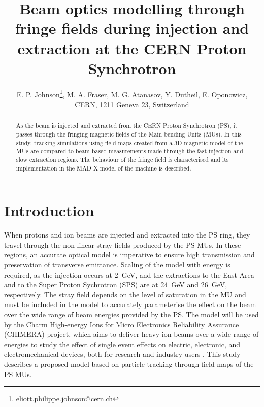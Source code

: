 \documentclass[a4paper,
               biblatex,     %
               keeplastbox,   %
               ]{jacow}
\begin{document}
\title{Beam optics modelling through fringe fields during injection and extraction at the CERN Proton Synchrotron}

\author{E. P. Johnson\thanks{eliott.philippe.johnson@cern.ch}, M. A. Fraser, M. G. Atanasov, Y. Dutheil, E. Oponowicz,\\ CERN, 1211 Geneva 23, Switzerland}
	
\maketitle

%
\begin{abstract}
As the beam is injected and extracted from the CERN Proton Synchrotron (PS), it passes through the fringing magnetic fields of the Main bending Units (MUs). In this study, tracking simulations using field maps created from a 3D magnetic model of the MUs are compared to beam-based measurements made through the fast injection and slow extraction regions. The behaviour of the fringe field is characterised and its implementation in the MAD-X model of the machine is described.
\end{abstract}


\section{Introduction}
When protons and ion beams are injected and extracted into the PS ring, they travel through the non-linear stray fields produced by the PS MUs. In these regions, an accurate optical model is imperative to ensure high transmission and preservation of transverse emittance. Scaling of the model with energy is required, as the injection occurs at \SI{2}{GeV}, and the extractions to the East Area and to the Super Proton Sychrotron (SPS) are at \SI{24}{GeV} and \SI{26}{GeV}, respectively. The stray field depends on the level of saturation in the MU and must be included in the model to accurately parameterise the effect on the beam over the wide range of beam energies provided by the PS. The model will be used by the Charm High-energy Ions for Micro Electronics Reliability Assurance (CHIMERA) project, which aims to deliver heavy-ion beams over a wide range of energies to study the effect of single event effects on electric, electronic, and electromechanical devices, both for research and industry users \cite{fraser:ipac22-wepost012}. This study describes a proposed model based on particle tracking through field maps of the PS MUs.
\end{document}
